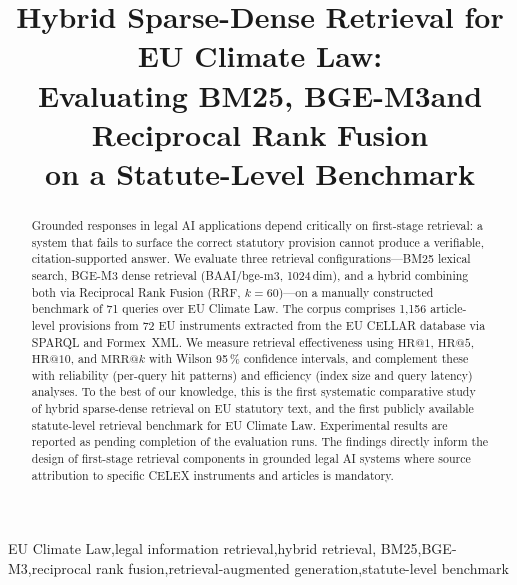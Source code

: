 \documentclass{iosart2x}
\makeatletter
\newcommand{\HR}[1]{\text{HR}@{#1}}
\newcommand{\MRR}[1]{\text{MRR}@{#1}}
\newcommand{\PH}{\text{[PLACEHOLDER]}\xspace}
\newcommand{\bgem}{BGE-M3\xspace}
\newcommand{\rrf}{RRF\xspace}
\makeatother
\begin{document}
\begin{frontmatter}

\title{Hybrid Sparse-Dense Retrieval for EU Climate Law:\\
       Evaluating BM25, \bgem{}and Reciprocal Rank Fusion\\
       on a Statute-Level Benchmark}

\author[A]{ }

\address[A]{%
  [Institution]\\
}

\begin{abstract}
Grounded responses in legal AI applications depend critically on
first-stage retrieval: a system that fails to surface the correct
statutory provision cannot produce a verifiable, citation-supported
answer.  We evaluate three retrieval configurations---BM25 lexical
search, \bgem dense retrieval (BAAI/bge-m3, 1024\,dim), and a hybrid
combining both via Reciprocal Rank Fusion (\rrf, $k{=}60$)---on a
manually constructed benchmark of 71 queries over EU Climate Law.
The corpus comprises 1,156 article-level provisions from 72 EU
instruments extracted from the EU CELLAR database via SPARQL and
Formex~XML.  We measure retrieval effectiveness using $\HR{1}$,
$\HR{5}$, $\HR{10}$, and $\MRR{k}$ with Wilson 95\,\% confidence
intervals, and complement these with reliability (per-query hit
patterns) and efficiency (index size and query latency) analyses.
To the best of our knowledge, this is the first systematic comparative
study of hybrid sparse-dense retrieval on EU statutory text, and the
first publicly available statute-level retrieval benchmark for EU
Climate Law.  Experimental results are reported as \PH{}pending
completion of the evaluation runs.  The findings directly inform the
design of first-stage retrieval components in grounded legal AI
systems where source attribution to specific CELEX instruments and
articles is mandatory.
\end{abstract}

\begin{keyword}
EU Climate Law\sep legal information retrieval\sep hybrid retrieval\sep
BM25\sep BGE-M3\sep reciprocal rank fusion\sep retrieval-augmented
generation\sep statute-level benchmark
\end{keyword}

\end{frontmatter}

\end{document}
